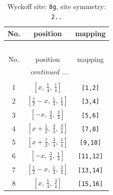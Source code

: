 \documentclass[fleqn,8pt]{jsarticle}
\begin{document}
\renewcommand{\arraystretch}{1.2}
\begin{longtable}{ccc}
\caption{Wyckoff site: {\tt 8g}, site symmetry: {\tt 2..}}
 \\
 \hline \hline
No. & position & mapping \\ \hline \endfirsthead

\multicolumn{2}{l}{\tablename\ \thetable{}} \\
 \hline \hline
No. & position & mapping \\ \hline \endhead

 \hline \hline
\multicolumn{2}{r}{\footnotesize\it continued ...} \\ \endfoot

 \hline \hline
\multicolumn{2}{r}{} \\ \endlastfoot

1 & $\left[ x,\, \frac{1}{4},\, \frac{1}{4} \right]$ & {\tt [1,2]} \\ \hline
2 & $\left[ \frac{1}{2} - x,\, \frac{1}{4},\, \frac{1}{4} \right]$ & {\tt [3,4]} \\ \hline
3 & $\left[ - x,\, \frac{3}{4},\, \frac{3}{4} \right]$ & {\tt [5,6]} \\ \hline
4 & $\left[ x + \frac{1}{2},\, \frac{3}{4},\, \frac{3}{4} \right]$ & {\tt [7,8]} \\ \hline
5 & $\left[ x + \frac{1}{2},\, \frac{3}{4},\, \frac{1}{4} \right]$ & {\tt [9,10]} \\ \hline
6 & $\left[ - x,\, \frac{3}{4},\, \frac{1}{4} \right]$ & {\tt [11,12]} \\ \hline
7 & $\left[ \frac{1}{2} - x,\, \frac{1}{4},\, \frac{3}{4} \right]$ & {\tt [13,14]} \\ \hline
8 & $\left[ x,\, \frac{1}{4},\, \frac{3}{4} \right]$ & {\tt [15,16]} \\
\end{longtable}
\renewcommand{\arraystretch}{1.2}
\end{document}
